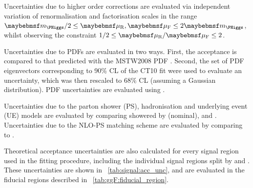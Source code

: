 Uncertainties due to higher order corrections are evaluated via independent variation of 
renormalisation and factorisation scales in the range $\mH/2 \leq \mur,\muf \leq 2\mH$, 
whilst observing the constraint $1/2 \leq \mur/\muf \leq 2$. 

Uncertainties due to PDFs are evaluated in two ways. First, the acceptance is compared to 
that predicted with the MSTW2008 PDF \cite{MSTW}. Second, the set of PDF eigenvectors 
corresponding to 90\% CL of the CT10 fit were used to evaluate an uncertainty, 
which was then rescaled to 68\% CL (assuming a Gaussian distribution). PDF uncertainties are 
evaluated using \mcatnlo.

Uncertainties due to the parton shower (PS), hadronisation and underlying event (UE) 
models are evaluated by comparing \powhegbox showered by  (nominal),  
and \fherwig. Uncertainties due to the NLO-PS matching scheme are evaluated by comparing 
\meps{\powhegbox}{\fherwig} to \meps{\mcatnlo}{\herwigpp}.

Theoretical acceptance uncertainties are also calculated for every signal region used in 
the fitting procedure, including the individual signal regions split by \ptsubleadlep and 
\mll. These uncertainties are shown in \Table~\ref{tab:signal:acc_unc}, and are evaluated 
in the fiducial regions described in \Table~\ref{tab:ggF:fiducial_region}.


